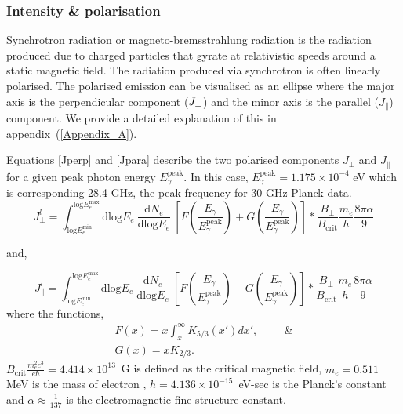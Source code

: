 \documentclass[12pt, a4 paper]{article}
\begin{document}
\subsubsection{Intensity \& polarisation}
Synchrotron radiation or magneto-bremsstrahlung radiation is the radiation produced due to charged particles that gyrate at relativistic speeds around a static magnetic field. The radiation produced via synchrotron is often linearly polarised.
The polarised emission can be visualised as an ellipse where the major axis is the perpendicular component ($J_{\rm \perp}$) and the minor axis is the parallel ($J_{\parallel}$) component. We provide a detailed explanation of this in appendix~(\ref{Appendix_A}). 

Equations \ref{Jperp} and \ref{Jpara} describe the two polarised components $J_{\perp}$ and $J_{\parallel}$ for a  given peak photon energy $E_{\gamma}^{\mathrm{peak}}$. In this case, $E_{\gamma}^{\mathrm{peak}} = 1.175 \times 10^{-4}$ eV which is corresponding 28.4 GHz, the peak frequency for 30 GHz Planck data.
\begin{equation}\label{Jperp}
 {J_{\perp}^l} =   \int_{\mathrm{log}E_e^{\mathrm{min}}}^{\mathrm{log}E_e^{\mathrm{max}}}\mathrm{dlog}E_{e} \  \frac{\mathrm{d}N_e}{\mathrm{dlog}E_{e}} \  \left[F\left(\frac{E_{\gamma}}{E_{\gamma}^{\mathrm{peak}}}\right) + G\left(\frac{E_{\gamma}}{E_{\gamma}^{\mathrm{peak}}}\right)\right] * \frac{B_{\perp}}{B_{\mathrm{crit}}}\frac{m_{e}}{h} \frac{8\pi \alpha}{9} 
\end{equation}

and,

\begin{equation}\label{Jpara}
{J_{\parallel}^l} = \int_{\mathrm{log}E_e^{\mathrm{min}}}^{\mathrm{log}E_e^{\mathrm{max}}}\mathrm{dlog}E_{e} \ \frac{\mathrm{d}N_e}{\mathrm{dlog}E_{e}} \  \left[F\left(\frac{E_{\gamma}}{E_{\gamma}^{\mathrm{peak}}}\right) - G\left(\frac{E_{\gamma}}{E_{\gamma}^{\mathrm{peak}}}\right)\right] * \frac{B_{\perp}}{B_{\mathrm{crit}}}\frac{m_{e}}{h} \frac{8\pi \alpha}{9}
\end{equation}
where the functions,
\begin{align}
F(x) = x \int_x^\infty K_{5/3}(x') dx',  \hspace{1cm}  \&  \\ G(x) = x K_{2/3}.
\end{align}
$B_{\mathrm{crit}} \frac{m_e^2c^3}{e\hbar} = 4.414 \times 10^{13}$~G is defined as the critical magnetic field, $m_e = 0.511$ MeV is the mass of electron , $h = 4.136 \times 10^{-15}$~eV-sec is the Planck's constant and $\alpha \approx \frac{1}{137}$ is the electromagnetic fine structure constant.
\end{document}
